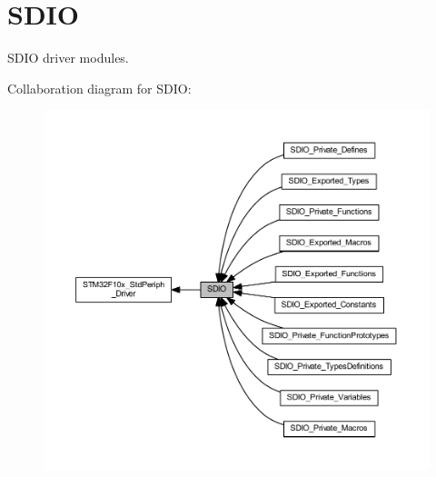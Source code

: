\hypertarget{group___s_d_i_o}{}\section{S\+D\+IO}
\label{group___s_d_i_o}


S\+D\+IO driver modules.  


Collaboration diagram for S\+D\+IO\+:
\nopagebreak
\begin{figure}[H]
\begin{center}
\leavevmode
\includegraphics[width=350pt]{group___s_d_i_o}
\end{center}
\end{figure}
